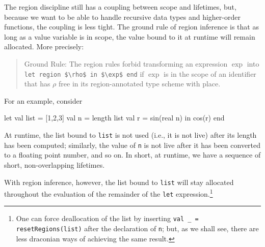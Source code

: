 \documentclass[12pt]{book}
\begin{document}
The region discipline still has a coupling between scope and lifetimes, but,
because we want to be able to handle recursive data types and higher-order
functions, the coupling is less tight.  The ground rule of region inference
%
%
%
%
is that as long as a value variable is in scope, the value bound to it at
runtime will remain allocated. More precisely:
\begin{quote}
  Ground Rule: The region rules forbid transforming an expression $\exp$ into
  \lstinline!let region $\rho$ in $\exp$ end! if $\exp$ is in the scope of an
  identifier that has $\rho$ free in its region-annotated type scheme with
  place.
\end{quote}
For an example, consider
\begin{smlcode}
  let
     val list = [1,2,3]
     val n = length list
     val r = sin(real n)
  in
     cos(r)
  end
\end{smlcode}
At runtime, the list bound to \lstinline{list} is not used (i.e., it is not
live) after its length has been computed; similarly, the value of \lstinline{n}
is not live after it has been converted to a floating point number, and so
on. In short, at runtime, we have a sequence of short, non-overlapping
lifetimes.

With region inference, however, the list bound to \lstinline{list} will stay
allocated throughout the evaluation of the remainder of the \lstinline{let}
expression.\footnote{One can force deallocation of the list by inserting
\lstinline!val _ = resetRegions(list)! after the declaration of \lstinline{n};
but, as we shall see, there are less draconian ways of achieving the same
result.}
\end{document}

